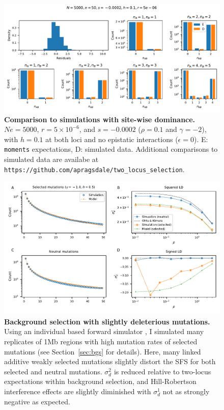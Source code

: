 \documentclass[]{article}
\begin{document}
\begin{figure}[ht!]
    \centering
    \includegraphics[width=\textwidth]{../simulations/discrete/plots/comp_Ne_5000_n_50_r_5e-06_s_0.0002_h_0.1.pdf}
    \caption{
        \textbf{Comparison to simulations with site-wise dominance.}
        \(Ne=5000\), \(r=5\times10^{-6}\), and \(s=-0.0002\) (\(\rho=0.1\) and
        \(\gamma=-2\)), with \(h=0.1\) at both loci and no
        epistatic interactions (\(\epsilon=0\)).
        E: \texttt{moments} expectations, D: simulated data.
        Additional comparisons to simulated data are availabe at
        \texttt{https://github.com/apragsdale/two\_locus\_selection}.
    }
    \label{fig:validation5}
\end{figure}

\begin{figure}[ht!]
    \centering
    \includegraphics{../figures/bgs_gamma_-1.0_h_0.5_n_50}
    \caption{
        \textbf{Background selection with slightly deleterious mutations.}
        Using an individual based forward simulator \citep{Thornton2019-qc}, I
        simulated many replicates of 1Mb regions with high mutation rates of
        selected mutations (see Section~\ref{sec:bgs} for details). Here,
        many linked additive weakly selected mutations slightly distort the
        SFS for both selected and neutral mutations. \(\sigma_d^2\) is reduced
        relative to two-locus expectations within background selection, and
        Hill-Robertson interference effects are slightly diminished with
        \(\sigma_d^1\) not as strongly negative as expected.
    }
    \label{fig:bgs1}
\end{figure}
\end{document}
